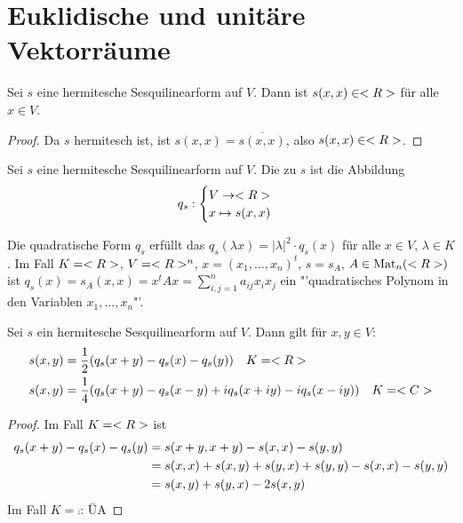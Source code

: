 \section{Euklidische und unitäre Vektorräume}

\begin{lemma}
	Sei $s$ eine hermitesche Sesquilinearform auf $V$. Dann ist $s(x,x)\in<R>$ für alle $x\in V$.
\end{lemma}
\begin{proof}
	Da $s$ hermitesch ist, ist $s(x,x)=\overline{s(x,x)}$, also $s(x,x)\in<R>$.
\end{proof}

\begin{definition}
	Sei $s$ eine hermitesche Sesquilinearform auf $V$. Die  zu $s$ ist die Abbildung
	\begin{align}
		q_s:\begin{cases}
		V\to <R> \\ x\mapsto s(x,x)
		\end{cases}\notag
	\end{align}
\end{definition}

\begin{remark}
	Die quadratische Form $q_s$ erfüllt das $q_s(\lambda x)=\vert\lambda\vert^2\cdot q_s(x)$ für alle $x\in V$, $\lambda\in K$. Im Fall $K=<R>$, $V=<R>^n$, $x=(x_1,...,x_n)^t$, $s=s_A$, $A\in\operatorname{Mat}_n(<R>)$ ist $q_s(x)=s_A(x,x)=x^tAx=\sum_{i,j=1}^n a_{ij}x_ix_j$ ein "'quadratisches Polynom in den Variablen $x_1,...,x_n$"'.
\end{remark}

\begin{proposition}[Polarisierung]
	Sei $s$ ein hermitesche Sesquilinearform auf $V$. Dann gilt für $x,y\in V$:
	\begin{align}
		s(x,y)&=\frac 1 2 (q_s(x+y)-q_s(x)-q_s(y))\quad K=<R>\notag \\
		s(x,y)&=\frac 1 4 (q_s(x+y)-q_s(x-y)+iq_s(x+iy)-iq_s(x-iy))\quad K=<C>\notag
	\end{align}
\end{proposition}
\begin{proof}
	Im Fall $K=<R>$ ist
	\begin{align}
		q_s(x+y)-q_s(x)-q_s(y)&= s(x+y,x+y)-s(x,x)-s(y,y)\notag \\
		&= s(x,x)+s(x,y)+s(y,x)+s(y,y)-s(x,x)-s(y,y)\notag \\
		&= s(x,y)+s(y,x)-2s(x,y)\notag
	\end{align}
	Im Fall $K=\comp$: ÜA
\end{proof}

